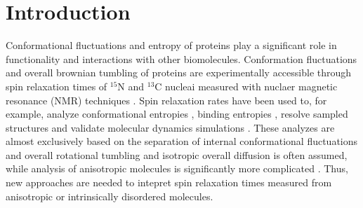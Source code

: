 \documentclass[pre,aps,floatfix,authordate1-4,twocolumn]{revtex4-1}
\begin{document}

\maketitle %



\section{Introduction}
Conformational fluctuations and entropy of proteins
play a significant role in functionality
and interactions with other biomolecules.
Conformation fluctuations and overall brownian tumbling of proteins
are experimentally accessible through 
spin relaxation times of $^{15}$N and $^{13}$C nucleai measured
with nuclaer magnetic resonance (NMR) 
techniques \cite{jarymowycz06,korzhnev01,mulder01,eisenmesser05,bedem15,lewandowski15,lamley15}. 
Spin relaxation rates have been used to, for example, analyze
conformational entropies \cite{yang96,kasinath13,allner15,jarymowycz06}, binding entropies \cite{akke93,jarymowycz06},
resolve sampled structures \cite{mulder01,eisenmesser05,bedem15,medina14}
and validate molecular dynamics simulations \cite{best04,showalter07a,showalter07b,maragakis08,trbovic08}.
These analyzes are almost exclusively based on the
separation of internal conformational fluctuations 
and overall rotational tumbling \cite{wennerstrom79,Lipari82} and
isotropic overall diffusion is often assumed, while
analysis of anisotropic molecules is significantly more
complicated \cite{woessner62,shimizu62,jarymowycz06,korzhnev01,luginbuhl97,hall04}.
Thus, new approaches are needed to intepret spin relaxation times
measured from anisotropic or intrinsically disordered molecules.


%
\end{document}
